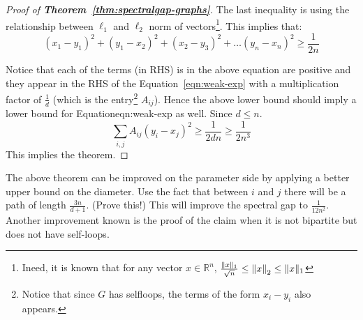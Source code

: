 \begin{proof}[{Proof of \bf Theorem~\ref{thm:spectralgap-graphs}}]
\noindent The last inequality is using the relationship between $\ell_1$ and $\ell_2$ norm of vectors\footnote{Ineed, it is known that for any vector $x \in \mathbb{R}^n$, $\frac{\Vert x \Vert_1}{\sqrt{n}} \le {\left\lVert x\right\rVert}_2 \le \Vert x \Vert_1$}.
This implies that:
$$(x_1 - y_1)^2 + (y_1 - x_2)^2 + (x_2 - y_3)^2 + \ldots (y_n -  x_n)^2 \ge \frac{1}{2n}$$

Notice that each of the terms (in RHS) is  in the above equation are positive and they appear in the RHS of the Equation~\ref{eqn:weak-exp} with a multiplication factor of $\frac{1}{d}$ (which is the entry\footnote{Notice that since $G$ has selfloops, the terms of the form $x_i-y_i$ also appears.} $A_{ij}$). Hence the above lower bound should imply a lower bound for Equation{eqn:weak-exp} as well. Since $d \le n$.
$$\sum_{i,j} A_{ij}(y_i-x_j)^2 \ge \frac{1}{2dn} \ge \frac{1}{2n^3}$$
This implies the theorem.
\end{proof}
\begin{remark}
The above theorem can be improved on the parameter side by applying a better upper bound on the diameter. Use the fact that between $i$ and $j$ there will be a path of length $\frac{3n}{d+1}$. (Prove this!) This will improve the spectral gap to $\frac{1}{12n^2}$. Another improvement known is the proof of the claim when it is not bipartite but does not have self-loops.
\end{remark}